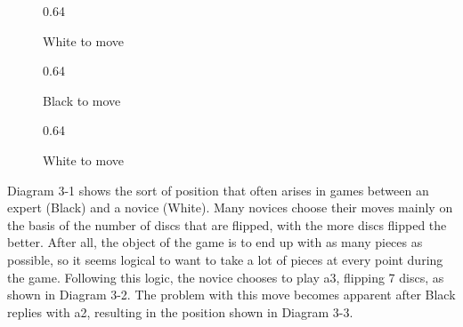 \documentclass[a4paper,12pt]{book}
\newcommand{\scalefactorthreeup}{0.64}
\begin{document}
\begin{figure}[h]
\begin{center}
\begin{minipage}[t]{.32\textwidth}
\begin{othelloboard}{\scalefactorthreeup}
\dotmarkings
{}
\end{othelloboard}
\caption{White to move}
\end{minipage}
\hfill
\begin{minipage}[t]{.32\textwidth}
\begin{othelloboard}{\scalefactorthreeup}
\dotmarkings
{}
\end{othelloboard}
\caption{Black to move}
\end{minipage}
\hfill
\begin{minipage}[t]{.32\textwidth}
\begin{othelloboard}{\scalefactorthreeup}
\dotmarkings
{}
\end{othelloboard}
\caption{White to move}
\end{minipage}
\end{center}
\end{figure}

Diagram 3-1 shows the sort of position that often arises in games between an
expert (Black) and a novice (White). Many novices choose their moves mainly on the
basis of the number of discs that are flipped, with the more discs flipped the better.
After all, the object of the game is to end up with as many pieces as possible, so it
seems logical to want to take a lot of pieces at every point during the game. Following
this logic, the novice chooses to play a3, flipping 7 discs, as shown in Diagram 3-2.
The problem with this move becomes apparent after Black replies with a2, resulting
in the position shown in Diagram 3-3.
\end{document}
